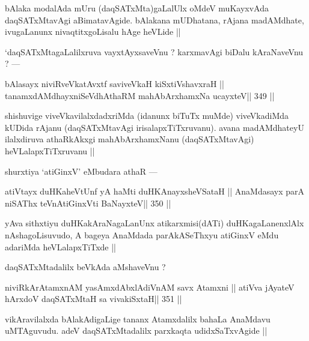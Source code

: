 \begin{artha}
bAlaka modalAda mUru (daqSATxMta)gaLalUlx oMdeV muKayxvAda 
daqSATxMtavAgi aBimatavAgide. bAlakana mUDhatana, rAjana madAMdhate, ivugaLanunx nivaqtitxgoLisalu hAge heVLide ||
\end{artha}

\begin{artha}
`daqSATxMtagaLalilxruva vayxtAyxsaveVnu ? karxmavAgi biDalu kAraNaveVnu ? ---
\end{artha}

\begin{shl}
bAlasayx niviRveVkatAvxtf saviveVkaH kiSxtiVshavxraH ||
tanamxdAMdhayxniSeVdhAthaRM mahAbArxhamxNa ucayxteV\hfill || 349 ||
\end{shl}

\begin{artha}
shishuvige viveVkavilalxdadxriMda (idanunx biTuTx muMde) viveVkadiMda 
kUDida rAjanu (daqSATxMtavAgi irisalapxTiTxruvanu). avana madAMdhateyU ilalxdiruva athaRkAkxgi mahAbArxhamxNanu (daqSATxMtavAgi) heVLalapxTiTxruvanu ||
\end{artha}


\begin{artha}
shurxtiya `atiGinxV' eMbudara athaR ---
\end{artha}

\begin{shl}
atiVtayx duHKaheVtUnf yA haMti duHKAnayxsheVSataH ||
AnaMdasayx parA niSAThx teVnAtiGinxVti BaNayxteV\hfill || 350 ||
\end{shl}

\begin{artha}
yAva sithxtiyu duHKakAraNagaLanUnx atikarxmisi(dATi) duHKagaLanenxlAlx nAshagoLisuvudo, A bageya AnaMdada parAkASeThxyu atiGinxV eMdu adariMda heVLalapxTiTxde ||
\end{artha}

\begin{artha}
daqSATxMtadalilx beVkAda aMshaveVnu ?
\end{artha}

\begin{shl}
niviRkArAtamxnAM yasAmxdAbxlAdiVnAM savx Atamxni ||
atiVva jAyateV hArxdoV daqSATxMtaH sa vivakiSxtaH\hfill || 351 ||
\end{shl}

\begin{artha}
vikAravilalxda bAlakAdigaLige tananx Atamxdalilx bahaLa AnaMdavu 
uMTAguvudu. adeV daqSATxMtadalilx parxkaqta udidxSaTxvAgide ||
\end{artha}

